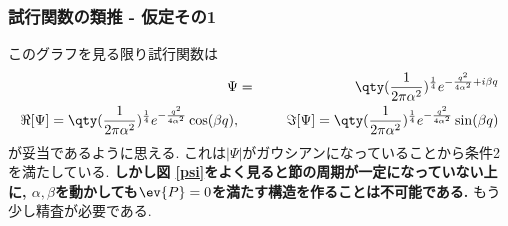 \documentclass[10.5pt,a4paper]{jreport}
\begin{document}
\subsubsection{試行関数の類推 - 仮定その1}
このグラフを見る限り試行関数は
\begin{eqnarray}
  \Psi &=& \qty(\frac{1}{2\pi\alpha^2})^\frac14e^{-\frac{q^2}{4\alpha^2} + i\beta q}\\
  \Re[\Psi] = \qty(\frac{1}{2\pi\alpha^2})^\frac14e^{-\frac{q^2}{4\alpha^2}}\cos(\beta q), &&\hspace{0.5cm}\Im[\Psi] = \qty(\frac{1}{2\pi\alpha^2})^\frac14e^{-\frac{q^2}{4\alpha^2}}\sin(\beta q)
\end{eqnarray}
が妥当であるように思える. これは$|\Psi|$がガウシアンになっていることから条件2を満たしている. \textbf{しかし図 \ref{psi}をよく見ると節の周期が一定になっていない上に, $\alpha, \beta$を動かしても$\ev{P}=0$を満たす構造を作ることは不可能である.} もう少し精査が必要である.
\end{document}
